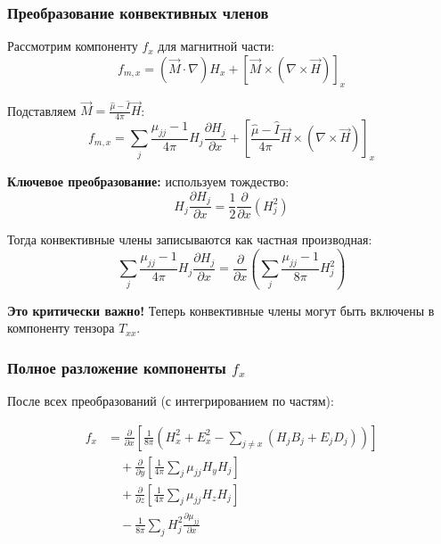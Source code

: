 \documentclass[a4paper,12pt]{article}
\begin{document}
\subsubsection{Преобразование конвективных членов}

Рассмотрим компоненту $f_x$ для магнитной части:
\begin{equation}
f_{m,x} = (\vec{M}\cdot\nabla)H_x + [\vec{M}\times(\nabla\times\vec{H})]_x
\label{eq:magnetic_force_x}
\end{equation}

Подставляем $\vec{M} = \frac{\hat{\mu}-\hat{I}}{4\pi}\vec{H}$:
\begin{equation}
f_{m,x} = \sum_j\frac{\mu_{jj}-1}{4\pi}H_j\frac{\partial H_j}{\partial x} + \left[\frac{\hat{\mu}-\hat{I}}{4\pi}\vec{H}\times(\nabla\times\vec{H})\right]_x
\label{eq:magnetic_force_explicit}
\end{equation}

\textbf{Ключевое преобразование:} используем тождество:
\begin{equation}
H_j\frac{\partial H_j}{\partial x} = \frac{1}{2}\frac{\partial}{\partial x}(H_j^2)
\label{eq:derivative_identity}
\end{equation}

Тогда конвективные члены записываются как частная производная:
\begin{equation}
\sum_j\frac{\mu_{jj}-1}{4\pi}H_j\frac{\partial H_j}{\partial x} = \frac{\partial}{\partial x}\left(\sum_j\frac{\mu_{jj}-1}{8\pi}H_j^2\right)
\label{eq:convective_as_derivative}
\end{equation}

\textbf{Это критически важно!} Теперь конвективные члены могут быть включены в компоненту тензора $T_{xx}$.

\subsubsection{Полное разложение компоненты $f_x$}

После всех преобразований (с интегрированием по частям):

\begin{equation}
\boxed{
\begin{aligned}
f_x &= \frac{\partial}{\partial x}\left[\frac{1}{8\pi}\left(H_x^2 + E_x^2 - \sum_{j\neq x}(H_j B_j + E_j D_j)\right)\right] \\
&\quad + \frac{\partial}{\partial y}\left[\frac{1}{4\pi}\sum_j \mu_{jj} H_y H_j\right] \\
&\quad + \frac{\partial}{\partial z}\left[\frac{1}{4\pi}\sum_j \mu_{jj} H_z H_j\right] \\
&\quad - \frac{1}{8\pi}\sum_j H_j^2 \frac{\partial\mu_{jj}}{\partial x}
\end{aligned}
}
\label{eq:fx_full}
\end{equation}
\end{document}
